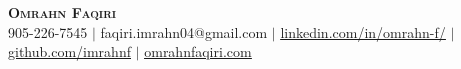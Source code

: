 \begin{center}
    \textbf{\Huge \scshape Omrahn Faqiri} \\ \vspace{1pt}
    \small 905-226-7545 $|$ {faqiri.imrahn04@gmail.com} $|$ 
    \href{https://www.linkedin.com/in/omrahn-f/}{\underline{linkedin.com/in/omrahn-f/}} $|$ 
    \href{https://github.com/imrahnf}{\underline{github.com/imrahnf}} $|$
    \href{https://www.omrahnfaqiri.com}{\underline{omrahnfaqiri.com}}
\end{center}
